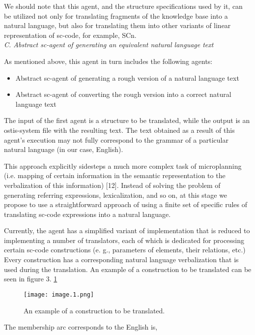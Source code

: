 \documentclass[twocolumn]{scndocument}
\begin{document}
\par We should note that this agent, and the structure
specifications used by it, can be utilized not only for
translating fragments of the knowledge base into a natural
language, but also for translating them into other variants
of linear representation of sc-code, for example, SCn.
\vspace{3mm}
\\
\textit{C. Abstract sc-agent of generating an equivalent natural language text}
\vspace{3mm}
\par As mentioned above, this agent in turn includes the
following agents:
\begin{itemize}
  \item Abstract sc-agent of generating a rough version of
a natural language text
 \newpage \item Abstract sc-agent of converting the rough version
into a correct natural language text
\end{itemize}
\par The input of the first agent is a structure to be translated, while the output is an ostis-system file with the
resulting text. The text obtained as a result of this agent’s
execution may not fully correspond to the grammar of a
particular natural language (in our case, English).
\par This approach explicitly sidesteps a much more complex task of microplanning (i.e. mapping of certain information in the semantic representation to the verbalization
of this information) [12]. Instead of solving the problem
of generating referring expressions, lexicalization, and so
on, at this stage we propose to use a straightforward approach of using a finite set of specific rules of translating
sc-code expressions into a natural language.
\par Currently, the agent has a simplified variant of implementation that is reduced to implementing a number
of translators, each of which is dedicated for processing certain sc-code constructions (e. g., parameters of
elements, their relations, etc.) Every construction has a
corresponding natural language verbalization that is used
during the translation. An example of a construction to
be translated can be seen in figure 3. \ref{figure 1}
\begin{figure}[H]
  \texttt{[image: image.1.png]}
  \caption{An example of a construction to be translated.}
  \label{figure 1}
\end{figure}
\par The membership arc corresponds to the English is,
\end{document}
